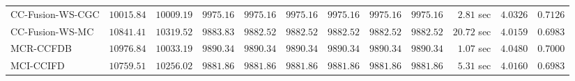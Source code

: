 \begin{table}[H]
\begin{tabular}{lrrrrrrrrrrr}
    CC-Fusion-WS-CGC & $     10015.84$ & $     10009.19$ & $      9975.16$ & $      9975.16$ & $      9975.16$ & $      9975.16$ & $      9975.16$ & $      9975.16$ & $         2.81$ sec    & $       4.0326$  & $       0.7126$ \\ 
     CC-Fusion-WS-MC & $     10841.41$ & $     10319.52$ & $      9883.83$ & $      9882.52$ & $      9882.52$ & $      9882.52$ & $      9882.52$ & $      9882.52$ & $        20.72$ sec    & $       4.0159$  & $       0.6983$ \\ 
\cmidrule{1-1} 
           MCR-CCFDB & $     10976.84$ & $     10033.19$ & $      9890.34$ & $      9890.34$ & $      9890.34$ & $      9890.34$ & $      9890.34$ & $      9890.34$ & $         1.07$ sec    & $       4.0480$  & $       0.7000$ \\ 
\cmidrule{1-1} 
           MCI-CCIFD & $     10759.51$ & $     10256.02$ & $      9881.86$ & $      9881.86$ & $      9881.86$ & $      9881.86$ & $      9881.86$ & $      9881.86$ & $         5.31$ sec    & $       4.0160$  & $       0.6983$ \\ 
\bottomrule
\end{tabular}
\end{table}


